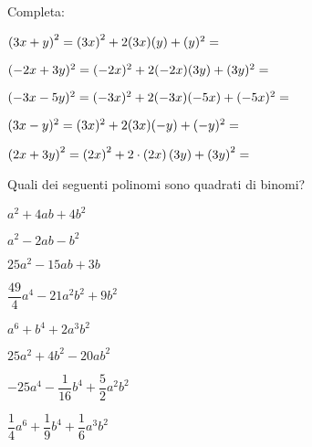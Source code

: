 
\subsubsection*{}

\begin{esercizio}
 \label{ese:11.1}
Completa:

\begin{enumeratea}
\item \( \left( 3x + y\right)^{2} = \left(3x\right)^{2} + 2(3x)(y) + (y) ^{2} = 
\dotfill~\)
\item \( (-2x + 3y)^{2} = (-2x)^{2} + 2(-2x)(3y) +(3y)^{2} = \dotfill~\)
\item \((-3x -5y)^{2} = (-3x)^{2} + 2(-3x)(-5x)+(-5x)^{2}= \dotfill~\)
\item \((3x - y)^{2} = (3x)^{2} +2(3x)(-y) + (-y)^{2} = \dotfill~\)
\item 
\(\left(2x+3y\right)^{2}=\left(2x\right)^{2}
+2\cdot\left(2x\right)\left(3y\right)+\left(3y\right)^{2}=\dotfill\)
\end{enumeratea}
\end{esercizio}


\begin{esercizio}
 \label{ese:11.2}
Quali dei seguenti polinomi sono quadrati di binomi?

\begin{multicols}{2}
\TabPositions{4cm}
\begin{enumeratea}
\spazielenx
\item \(a^{2}+4{ab}+4b^{2}\) \tab\boxSi\quad\boxNo
\item \(a^{2}-2{ab}-b^{2}\) \tab\boxSi\quad\boxNo
\item \(25a^{2}-15{ab}+3b\) \tab\boxSi\quad\boxNo
\item \(\dfrac{49}{4}a^{4}-21a^{2}b^{2}+9b^{2}\) \tab\boxSi\quad\boxNo
\item \(a^{6}+b^{4}+2a^{3}b^{2}\) \tab\boxSi\quad\boxNo
\item \(25a^{2}+4b^{2}-20{ab}^{2}\) \tab\boxSi\quad\boxNo
\item \(-25a^{4}-\dfrac{1}{16}b^{4}+\dfrac{5}{2}a^{2}b^{2}\) \tab\boxSi\quad\boxNo
\item \(\dfrac{1}{4}a^{6}+\dfrac{1}{9}b^{4}+\dfrac{1}{6}a^{3}b^{2}\) 
\tab\boxSi\quad\boxNo
\end{enumeratea}
\end{multicols}
\end{esercizio}

